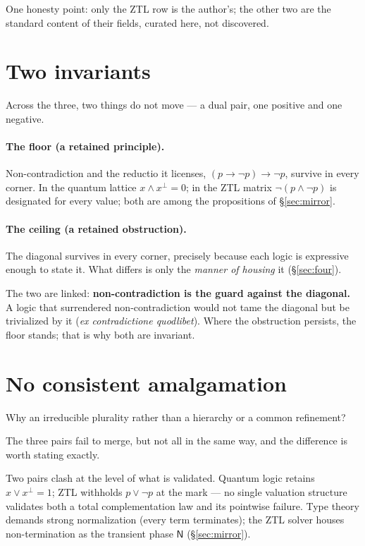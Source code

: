 \documentclass[11pt]{article}
\theoremstyle{remark}
\newcommand{\Nph}{\mathsf{N}}
\begin{document}
One honesty point: only the ZTL row is the author's; the other two are the
standard content of their fields, curated here, not discovered.

\section{Two invariants}\label{sec:inv}

Across the three, two things do not move --- a dual pair, one positive and one
negative.

\paragraph{The floor (a retained principle).} Non-contradiction and the
reductio it licenses, $(p \to \neg p) \to \neg p$, survive in every corner. In
the quantum lattice $x \wedge x^{\perp} = 0$; in the ZTL matrix
$\neg(p \wedge \neg p)$ is designated for every value; both are among the
propositions of \S\ref{sec:mirror}.

\paragraph{The ceiling (a retained obstruction).} The diagonal survives in
every corner, precisely because each logic is expressive enough to state it.
What differs is only the \emph{manner of housing} it (\S\ref{sec:four}).

The two are linked: \textbf{non-contradiction is the guard against the
diagonal.} A logic that surrendered non-contradiction would not tame the
diagonal but be trivialized by it (\emph{ex contradictione quodlibet}). Where
the obstruction persists, the floor stands; that is why both are invariant.

\section{No consistent amalgamation}\label{sec:noamalg}

Why an irreducible plurality rather than a hierarchy or a common refinement?

The three pairs fail to merge, but not all in the same way, and the
difference is worth stating exactly.

Two pairs clash at the level of what is validated. Quantum logic retains
$x \vee x^{\perp} = 1$; ZTL withholds $p \vee \neg p$ at the mark --- no
single valuation structure validates both a total complementation law and
its pointwise failure. Type theory demands strong normalization (every term
terminates); the ZTL solver houses non-termination as the transient phase
$\Nph$ (\S\ref{sec:mirror}).
\end{document}
